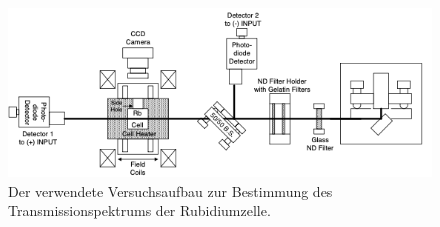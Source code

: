 \begin{figure}
    \centering
    \includegraphics[width=\textwidth]{content/pics/Aufbau.png}
    \caption{Der verwendete Versuchsaufbau zur Bestimmung des Transmissionspektrums der Rubidiumzelle. \cite{diode_laser_spectroscopy}}
    \label{fig:Aufbau}
\end{figure}
